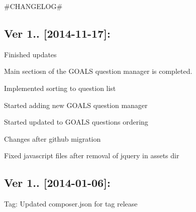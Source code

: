 \#\+C\+H\+A\+N\+G\+E\+L\+O\+G\#

\subsection*{Ver 1.. \mbox{[}2014-\/11-\/17\mbox{]}\+: }


\begin{DoxyItemize}
\item Finished updates
\item Main sectiosn of the G\+O\+A\+L\+S question manager is completed.
\item Implemented sorting to question list
\item Started adding new G\+O\+A\+L\+S question manager
\item Started updated to G\+O\+A\+L\+S questions ordering
\item Changes after github migration
\item Fixed javascript files after removal of jquery in assets dir
\end{DoxyItemize}

\subsection*{Ver 1.. \mbox{[}2014-\/01-\/06\mbox{]}\+: }


\begin{DoxyItemize}
\item Tag\+: Updated composer.\+json for tag release 
\end{DoxyItemize}